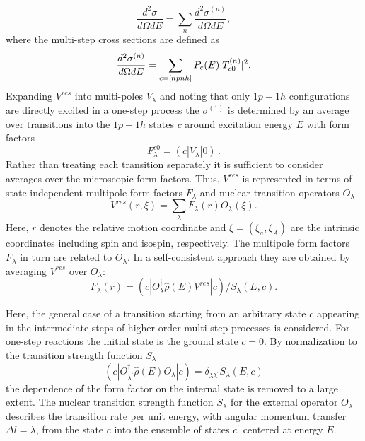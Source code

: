 \begin{equation}
\frac{d^{2}\sigma}{d\Omega dE}=\sum_{n}{\frac{d^{2}\sigma^{(n)}}{d\Omega dE}}%
,  \label{sigma0}
\end{equation}
\noindent where the multi-step cross sections are defined as
\begin{equation}
\frac{d^{2}\sigma^{(n)}}{d\Omega dE}=\sum_{c=[npnh]}{%
P_{c}(E)|T_{c0}^{(n)}|^{2}}.  \label{sign}
\end{equation}
\noindent Expanding $V^{res}$ into multi-poles $V_{\lambda}$ and noting that
only $1p-1h$ configurations are directly excited in a one-step process the $%
\sigma^{(1)}$ is determined by an average over transitions into the $1p-1h$
states $c$ around excitation energy $E$ with form factors
\begin{equation}
F_{\lambda}^{c0}=(c|V_{\lambda}|0)\,.
\end{equation}
\noindent Rather than treating each transition separately it is sufficient
to consider averages over the microscopic form factors. Thus, $V^{res}$ is
represented in terms of state independent multipole form factors $%
F_{\lambda} $ and nuclear transition operators $O_{\lambda}$
\begin{equation}
V^{res}(r,\xi)=\sum_{\lambda}{F_{\lambda}(r)O_{\lambda}(\xi)}.  \label{vres}
\end{equation}
\noindent Here, $r$ denotes the relative motion coordinate and $%
\xi=(\xi_{a},\xi_{A})$ are the intrinsic coordinates including spin and
isospin, respectively. The multipole form factors $F_{\lambda}$ in turn are
related to $O_{\lambda}$. In a self-consistent approach they are obtained by
averaging $V^{res}$ over $O_{\lambda}$:
\begin{equation}
F_{\lambda}(r)=(c|O_{\lambda}^{\dag}\hat{\rho}(E)V^{res}|c)/S_{\lambda}(E,c).
\label{formf}
\end{equation}

Here, the general case of a transition starting from an arbitrary state $c$
appearing in the intermediate steps of higher order multi-step
processes is considered. For one-step reactions the initial state is the ground
state $c=0$. By normalization to the transition strength function $%
S_{\lambda}$
\begin{equation}
(c|O_{\lambda^{\prime}}^{\dag}\hat{\rho}(E)O_{\lambda}|c)=\delta_{\lambda%
\lambda^{\prime}}S_{\lambda}(E,c)  \label{slambda}
\end{equation}
\noindent the dependence of the form factor on the internal state is removed
to a large extent. The nuclear transition strength function $S_{\lambda}$
for the external operator $O_{\lambda}$ describes the transition rate per
unit energy, with angular momentum transfer $\Delta l=\lambda$, from the
state $c$ into the ensemble of states $c^{\prime}$ centered at energy $E$.

